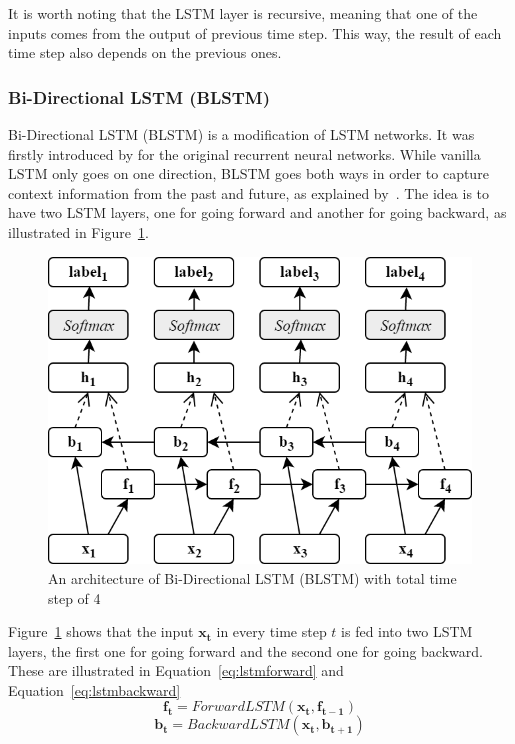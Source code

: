 It is worth noting that the LSTM layer is recursive, meaning that one of the inputs comes from the output of previous time step. This way, the result of each time step also depends on the previous ones.


\subsubsection{Bi-Directional LSTM (BLSTM)}
\label{sec:blstm}
Bi-Directional LSTM (BLSTM) is a modification of LSTM networks. It was firstly introduced by \cite{schuster1997bidirectional} for the original recurrent neural networks. While vanilla LSTM only goes on one direction, BLSTM goes both ways in order to capture context information from the past and future, as explained by~\cite{zhou2015end}. The idea is to have two LSTM layers, one for going forward and another for going backward, as illustrated in Figure~\ref{fig:bilstm}.

\begin{figure}
	\centering
	\includegraphics[width=0.75\linewidth]{images/blstm}
	\caption{An architecture of Bi-Directional LSTM (BLSTM) with total time step of 4}
	\label{fig:bilstm}
\end{figure}

Figure~\ref{fig:bilstm} shows that the input $\mathbf{x_{t}}$ in every time step $t$ is fed into two LSTM layers, the first one for going forward and the second one for going backward. These are illustrated in Equation~\ref{eq:lstmforward} and Equation~\ref{eq:lstmbackward}
\begin{equation}
\label{eq:lstmforward}
\mathbf{f_{t}} = ForwardLSTM(\mathbf{x_{t}}, \mathbf{f_{t-1}})
\end{equation}
\begin{equation}
\label{eq:lstmbackward}
\mathbf{b_{t}} = BackwardLSTM(\mathbf{x_{t}}, \mathbf{b_{t+1}})
\end{equation}

